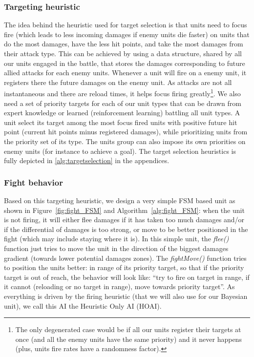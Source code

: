 \subsubsection{Targeting heuristic}
The idea behind the heuristic used for target selection is that units need to focus fire (which leads to less incoming damages if enemy units die faster) on units that do the most damages, have the less hit points, and take the most damages from their attack type. This can be achieved by using a data structure, shared by all our units engaged in the battle, that stores the damages corresponding to future allied attacks for each enemy units. Whenever a unit will fire on a enemy unit, it registers there the future damages on the enemy unit. As attacks are not all instantaneous and there are reload times, it helps focus firing greatly\footnote{The only degenerated case would be if all our units register their targets at once (and all the enemy units have the same priority) and it never happens (plus, units fire rates have a randomness factor).}. 
We also need a set of priority targets for each of our unit types that can be drawn from expert knowledge or learned (reinforcement learning) battling all unit types. A unit select its target among the most focus fired units with positive future hit point (current hit points minus registered damages), while prioritizing units from the priority set of its type. The units group can also impose its own priorities on enemy units (for instance to achieve a goal). The target selection heuristics is fully depicted in \ref{alg:targetselection} in the appendices.

\subsubsection{Fight behavior}
Based on this targeting heuristic, we design a very simple FSM based unit as shown in Figure~\ref{fig:fight_FSM} and Algorithm~\ref{alg:fight_FSM}: when the unit is not firing, it will either flee damages if it has taken too much damages and/or if the differential of damages is too strong, or move to be better positioned in the fight (which may include staying where it is). In this simple unit, the \textit{flee()} function just tries to move the unit in the direction of the biggest damages gradient (towards lower potential damages zones). The \textit{fightMove()} function tries to position the units better: in range of its priority target, so that if the priority target is out of reach, the behavior will look like: ``try to fire on target in range, if it cannot (reloading or no target in range), move towards priority target''. As everything is driven by the firing heuristic (that we will also use for our Bayesian unit), we call this AI the Heuristic Only AI (HOAI).

